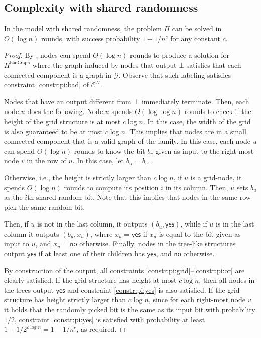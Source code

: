 \documentclass[11pt]{article}
\newcommand{\lbadgraph}{\mathsf {badGraph}}
\newcommand{\lyes}{\mathsf {yes}}
\newcommand{\lno}{\mathsf {no}}
\begin{document}
\subsection{Complexity with shared randomness}
\begin{theorem}\label{thm:ub-shared-rand}
	In the \local model with shared randomness, the problem $\Pi$ can be solved in $O(\log n)$ rounds, with success probability $1 - 1/n^c$ for any constant $c$.
\end{theorem}
\begin{proof}
	By , nodes can spend $O(\log n)$ rounds to produce a solution for $\Pi^{\lbadgraph}$ where the graph induced by nodes that output $\bot$ satisfies that each connected component is a graph in $\mathcal{G}$. Observe that such labeling satisfies constraint \ref{constr:pi:bad} of $\mathcal{C}^\Pi$.
	
	Nodes that have an output different from $\bot$ immediately terminate. Then, each node $u$ does the following. Node $u$ spends $O(\log \log n)$ rounds to check if the height of the grid structure is at most $c \log n$. In this case, the width of the grid is also guaranteed to be at most $c \log n$. This implies that nodes are in a small connected component that is a valid graph of the family. In this case, each node $u$ can spend $O(\log n)$ rounds to know the bit $b_v$ given as input to the right-most node $v$ in the row of $u$. In this case, let $b_u = b_v$.
	
	Otherwise, i.e., the height is strictly larger than $c \log n$, if $u$ is a grid-node, it spends $O(\log n)$ rounds to compute its position $i$ in its column. Then, $u$ sets $b_u$ as the $i$th shared random bit. Note that this implies that nodes in the same row pick the same random bit.

	Then, if $u$ is not in the last column, it outputs $(b_u,\lyes)$, while if $u$ is in the last column it outputs $(b_u,x_u)$, where $x_u = \lyes$ if $x_u$ is equal to the bit given as input to $u$, and $x_u = \lno$ otherwise.
	Finally, nodes in the tree-like structures output $\lyes$ if at least one of their children has $\lyes$, and $\lno$ otherwise.
	
	By construction of the output, all constraints \ref{constr:pi:grid}--\ref{constr:pi:or} are clearly satisfied. If the grid structure has height at most $c \log n$, then all nodes in the trees output $\lyes$ and constraint \ref{constr:pi:yes} is also satisfied. If the grid structure has height strictly larger than $c \log n$, since for each right-most node $v$ it holds that the randomly picked bit is the same as its input bit with probability $1/2$, constraint \ref{constr:pi:yes} is satisfied with probability at least $1 - 1 / 2^{c\log n} = 1 - 1 / n^c$, as required.
\end{proof}
\end{document}
